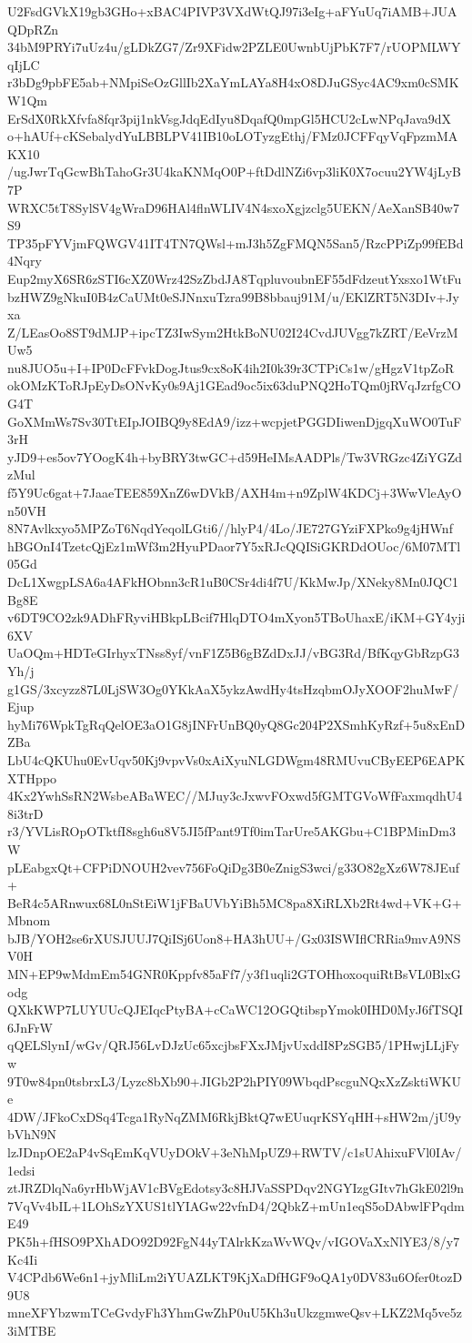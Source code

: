 U2FsdGVkX19gb3GHo+xBAC4PIVP3VXdWtQJ97i3eIg+aFYuUq7iAMB+JUAQDpRZn
34bM9PRYi7uUz4u/gLDkZG7/Zr9XFidw2PZLE0UwnbUjPbK7F7/rUOPMLWYqIjLC
r3bDg9pbFE5ab+NMpiSeOzGllIb2XaYmLAYa8H4xO8DJuGSyc4AC9xm0cSMKW1Qm
ErSdX0RkXfvfa8fqr3pij1nkVsgJdqEdIyu8DqafQ0mpGl5HCU2cLwNPqJava9dX
o+hAUf+cKSebalydYuLBBLPV41IB10oLOTyzgEthj/FMz0JCFFqyVqFpzmMAKX10
/ugJwrTqGcwBhTahoGr3U4kaKNMqO0P+ftDdlNZi6vp3liK0X7ocuu2YW4jLyB7P
WRXC5tT8SylSV4gWraD96HAl4flnWLIV4N4sxoXgjzclg5UEKN/AeXanSB40w7S9
TP35pFYVjmFQWGV41IT4TN7QWsl+mJ3h5ZgFMQN5San5/RzcPPiZp99fEBd4Nqry
Eup2myX6SR6zSTI6cXZ0Wrz42SzZbdJA8TqpluvoubnEF55dFdzeutYxsxo1WtFu
bzHWZ9gNkuI0B4zCaUMt0eSJNnxuTzra99B8bbauj91M/u/EKlZRT5N3DIv+Jyxa
Z/LEasOo8ST9dMJP+ipcTZ3IwSym2HtkBoNU02I24CvdJUVgg7kZRT/EeVrzMUw5
nu8JUO5u+I+IP0DcFFvkDogJtus9cx8oK4ih2I0k39r3CTPiCs1w/gHgzV1tpZoR
okOMzKToRJpEyDsONvKy0s9Aj1GEad9oc5ix63duPNQ2HoTQm0jRVqJzrfgCOG4T
GoXMmWs7Sv30TtEIpJOIBQ9y8EdA9/izz+wcpjetPGGDIiwenDjgqXuWO0TuF3rH
yJD9+es5ov7YOogK4h+byBRY3twGC+d59HeIMsAADPls/Tw3VRGzc4ZiYGZdzMul
f5Y9Uc6gat+7JaaeTEE859XnZ6wDVkB/AXH4m+n9ZplW4KDCj+3WwVleAyOn50VH
8N7Avlkxyo5MPZoT6NqdYeqolLGti6//hlyP4/4Lo/JE727GYziFXPko9g4jHWnf
hBGOnI4TzetcQjEz1mWf3m2HyuPDaor7Y5xRJcQQISiGKRDdOUoc/6M07MTl05Gd
DcL1XwgpLSA6a4AFkHObnn3cR1uB0CSr4di4f7U/KkMwJp/XNeky8Mn0JQC1Bg8E
v6DT9CO2zk9ADhFRyviHBkpLBcif7HlqDTO4mXyon5TBoUhaxE/iKM+GY4yji6XV
UaOQm+HDTeGIrhyxTNss8yf/vnF1Z5B6gBZdDxJJ/vBG3Rd/BfKqyGbRzpG3Yh/j
g1GS/3xcyzz87L0LjSW3Og0YKkAaX5ykzAwdHy4tsHzqbmOJyXOOF2huMwF/Ejup
hyMi76WpkTgRqQelOE3aO1G8jINFrUnBQ0yQ8Gc204P2XSmhKyRzf+5u8xEnDZBa
LbU4cQKUhu0EvUqv50Kj9vpvVs0xAiXyuNLGDWgm48RMUvuCByEEP6EAPKXTHppo
4Kx2YwhSsRN2WsbeABaWEC//MJuy3cJxwvFOxwd5fGMTGVoWfFaxmqdhU48i3trD
r3/YVLisROpOTktfI8sgh6u8V5JI5fPant9Tf0imTarUre5AKGbu+C1BPMinDm3W
pLEabgxQt+CFPiDNOUH2vev756FoQiDg3B0eZnigS3wci/g33O82gXz6W78JEuf+
BeR4c5ARnwux68L0nStEiW1jFBaUVbYiBh5MC8pa8XiRLXb2Rt4wd+VK+G+Mbnom
bJB/YOH2se6rXUSJUUJ7QiISj6Uon8+HA3hUU+/Gx03ISWIflCRRia9mvA9NSV0H
MN+EP9wMdmEm54GNR0Kppfv85aFf7/y3f1uqli2GTOHhoxoquiRtBsVL0BlxGodg
QXkKWP7LUYUUcQJEIqcPtyBA+cCaWC12OGQtibspYmok0IHD0MyJ6fTSQI6JnFrW
qQELSlynI/wGv/QRJ56LvDJzUc65xcjbsFXxJMjvUxddI8PzSGB5/1PHwjLLjFyw
9T0w84pn0tsbrxL3/Lyzc8bXb90+JIGb2P2hPIY09WbqdPscguNQxXzZsktiWKUe
4DW/JFkoCxDSq4Tcga1RyNqZMM6RkjBktQ7wEUuqrKSYqHH+sHW2m/jU9ybVhN9N
lzJDnpOE2aP4vSqEmKqVUyDOkV+3eNhMpUZ9+RWTV/c1sUAhixuFVl0IAv/1edsi
ztJRZDlqNa6yrHbWjAV1cBVgEdotsy3c8HJVaSSPDqv2NGYIzgGItv7hGkE02l9n
7VqVv4bIL+1LOhSzYXUS1tlYIAGw22vfnD4/2QbkZ+mUn1eqS5oDAbwlFPqdmE49
PK5h+fHSO9PXhADO92D92FgN44yTAlrkKzaWvWQv/vIGOVaXxNlYE3/8/y7Kc4Ii
V4CPdb6We6n1+jyMliLm2iYUAZLKT9KjXaDfHGF9oQA1y0DV83u6Ofer0tozD9U8
mneXFYbzwmTCeGvdyFh3YhmGwZhP0uU5Kh3uUkzgmweQsv+LKZ2Mq5ve5z3iMTBE
